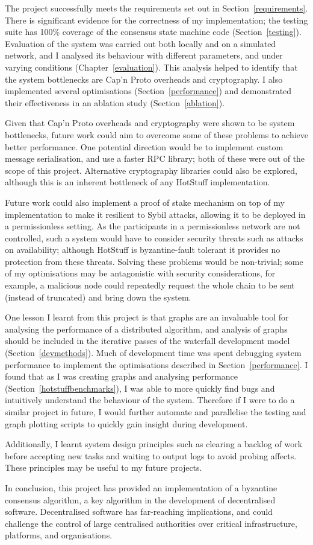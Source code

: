 The project successfully meets the requirements set out in Section~\ref{requirements}. There is significant evidence for the correctness of my implementation; the testing suite has 100\% coverage of the consensus state machine code (Section~\ref{testing}). Evaluation of the system was carried out both locally and on a simulated network, and I analysed its behaviour with different parameters, and under varying conditions (Chapter~\ref{evaluation}). This analysis helped to identify that the system bottlenecks are Cap'n Proto overheads and cryptography. I also implemented several optimisations (Section~\ref{performance}) and demonstrated their effectiveness in an ablation study (Section~\ref{ablation}).

Given that Cap'n Proto overheads and cryptography were shown to be system bottlenecks, future work could aim to overcome some of these problems to achieve better performance. One potential direction would be to implement custom message serialisation, and use a faster RPC library; both of these were out of the scope of this project. Alternative cryptography libraries could also be explored, although this is an inherent bottleneck of any HotStuff implementation.

Future work could also implement a proof of stake mechanism on top of my implementation to make it resilient to Sybil attacks, allowing it to be deployed in a permissionless setting. As the participants in a permissionless network are not controlled, such a system would have to consider  security threats such as attacks on availability; although HotStuff is byzantine-fault tolerant it provides no protection from these threats. Solving these problems would be non-trivial; some of my optimisations may be antagonistic with security considerations, for example, a malicious node could repeatedly request the whole chain to be sent (instead of truncated) and bring down the system.

One lesson I learnt from this project is that graphs are an invaluable tool for analysing the performance of a distributed algorithm, and analysis of graphs should be included in the iterative passes of the waterfall development model (Section~\ref{devmethods}). Much of development time was spent debugging system performance to implement the optimisations described in Section~\ref{performance}. I found that as I was creating graphs and analysing performance (Section~\ref{hotstuffbenchmarks}), I was able to more quickly find bugs and intuitively understand the behaviour of the system. Therefore if I were to do a similar project in future, I would further automate and parallelise the testing and graph plotting scripts to quickly gain insight during development.

Additionally, I learnt system design principles such as clearing a backlog of work before accepting new tasks and waiting to output logs to avoid probing affects. These principles may be useful to my future projects.

In conclusion, this project has provided an implementation of a byzantine consensus algorithm, a key algorithm in the development of decentralised software. Decentralised software has far-reaching implications, and could challenge the control of large centralised authorities over critical infrastructure, platforms, and organisations.